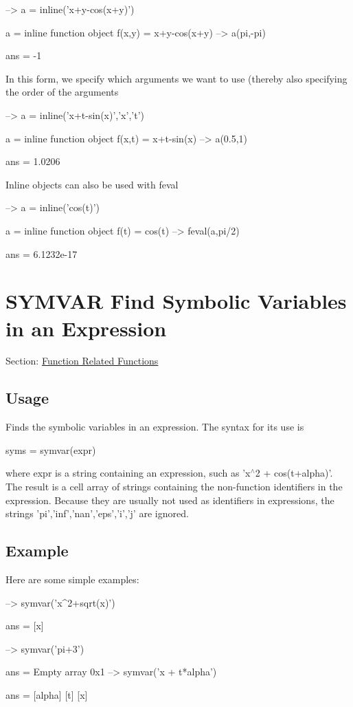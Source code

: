 \begin{DoxyVerbInclude}
--> a = inline('x+y-cos(x+y)')

a = 
  inline function object
  f(x,y) = x+y-cos(x+y)
--> a(pi,-pi)

ans = 
 -1 
\end{DoxyVerbInclude}


In this form, we specify which arguments we want to use (thereby also specifying the order of the arguments


\begin{DoxyVerbInclude}
--> a = inline('x+t-sin(x)','x','t')

a = 
  inline function object
  f(x,t) = x+t-sin(x)
--> a(0.5,1)

ans = 
    1.0206 
\end{DoxyVerbInclude}


Inline objects can also be used with {\ttfamily feval}


\begin{DoxyVerbInclude}
--> a = inline('cos(t)')

a = 
  inline function object
  f(t) = cos(t)
--> feval(a,pi/2)

ans = 
 6.1232e-17 
\end{DoxyVerbInclude}
 \hypertarget{function_symvar}{}\section{S\-Y\-M\-V\-A\-R Find Symbolic Variables in an Expression}\label{function_symvar}
Section\-: \hyperlink{sec_function}{Function Related Functions} \hypertarget{vtkwidgets_vtkxyplotwidget_Usage}{}\subsection{Usage}\label{vtkwidgets_vtkxyplotwidget_Usage}
Finds the symbolic variables in an expression. The syntax for its use is \begin{DoxyVerb}  syms = symvar(expr)
\end{DoxyVerb}
 where {\ttfamily expr} is a string containing an expression, such as {\ttfamily 'x$^\wedge$2 + cos(t+alpha)'}. The result is a cell array of strings containing the non-\/function identifiers in the expression. Because they are usually not used as identifiers in expressions, the strings {\ttfamily 'pi','inf','nan','eps','i','j'} are ignored. \hypertarget{variables_struct_Example}{}\subsection{Example}\label{variables_struct_Example}
Here are some simple examples\-:


\begin{DoxyVerbInclude}
--> symvar('x^2+sqrt(x)')  %

ans = 
 [x] 

--> symvar('pi+3')         %

ans = 
  Empty array 0x1
--> symvar('x + t*alpha')  %

ans = 
 [alpha] 
 [t] 
 [x] 
\end{DoxyVerbInclude}
 